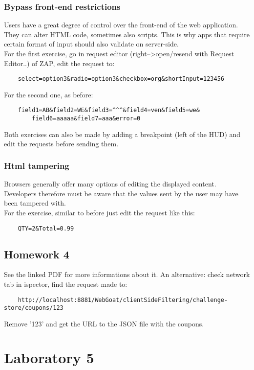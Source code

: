 \documentclass[a4paper, 10pt, titlepage]{article}
\begin{document}
\subsubsection*{Bypass front-end restrictions}
Users have a great degree of control over the front-end of the web application. They can alter HTML code, sometimes also scripts. This is why apps that require certain format of input should also validate on server-side. \\
For the first exercise, go in request editor (right-->open/resend with Request Editor..) of ZAP, edit the request to:
\begin{lstlisting}
	select=option3&radio=option3&checkbox=org&shortInput=123456
\end{lstlisting}
For the second one, as before:
\begin{lstlisting}
	field1=AB&field2=WE&field3=^^^&field4=ven&field5=we&
		field6=aaaaa&field7=aaa&error=0
\end{lstlisting}
Both exercises can also be made by adding a breakpoint (left of the HUD) and edit the requests before sending them.

\subsubsection*{Html tampering}
Browsers generally offer many options of editing the displayed content. Developers therefore must be aware that the values sent by the user may have been tampered with. \\
For the exercise, similar to before just edit the request like this:
\begin{lstlisting}
	QTY=2&Total=0.99
\end{lstlisting}

\subsection{Homework 4}
	See the linked PDF for more informations about it. An alternative: check network tab in ispector, find the request made to:
\begin{verbatim}
	http://localhost:8881/WebGoat/clientSideFiltering/challenge-store/coupons/123
\end{verbatim}	 
Remove '123' and get the URL to the JSON file with the coupons.

\section{Laboratory 5}
\end{document}
